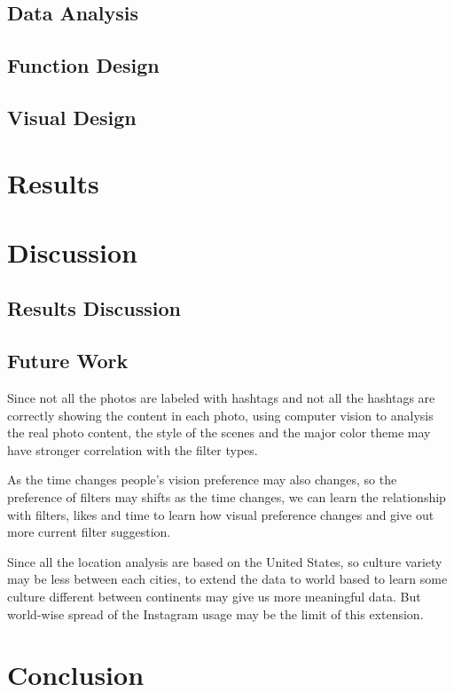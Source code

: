 \documentclass[conference]{acmsiggraph}
\begin{document}
\subsection{Data Analysis}

\subsection{Function Design}

\subsection{Visual Design}

\section{Results}

\section{Discussion}

\subsection{Results Discussion}

\subsection{Future Work}
Since not all the photos are labeled with hashtags and not all the hashtags are correctly showing the content in each photo, using computer vision to analysis the real photo content, the style of the scenes and the major color theme may have stronger correlation with the filter types.

As the time changes people’s vision preference may also changes, so the preference of filters may shifts as the time changes, we can learn the relationship with filters, likes and time to learn how visual preference changes and give out more current filter suggestion.

Since all the location analysis are based on the United States, so culture variety may be less between each cities, to extend the data to world based to learn some culture different between continents may give us more meaningful data. But world-wise spread of the Instagram usage may be the limit of this extension.

\section{Conclusion}
\end{document}
